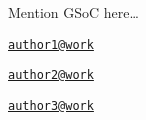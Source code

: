 Mention GSoC here\ldots{}

\address{%
Author One\\
Affiliation\\
line 1\\ line 2\\
}
\href{mailto:author1@work}{\nolinkurl{author1@work}}

\address{%
Author Two\\
Affiliation\\
line 1\\ line 2\\
}
\href{mailto:author2@work}{\nolinkurl{author2@work}}

\address{%
Author Three\\
Affiliation\\
line 1\\ line 2\\
}
\href{mailto:author3@work}{\nolinkurl{author3@work}}

